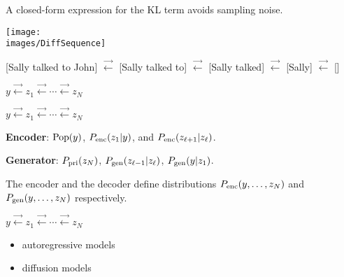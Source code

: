 {{\vfill
A closed-form expression for the KL term avoids sampling noise.
}



\centerline{\texttt{[image: \\images/DiffSequence]}}

\vfill
{\huge
\centerline{{\color{red} [Sally talked to John]} $\stackrel{\rightarrow}{\leftarrow}$ {\color{red} [Sally talked to]}
$\stackrel{\rightarrow}{\leftarrow}$ {\color{red}[Sally talked]} $\stackrel{\rightarrow}{\leftarrow}$ {\color{red}[Sally]} $\stackrel{\rightarrow}{\leftarrow}$ {\color{red} []}}
}

\vfill
\centerline{$y \stackrel{\rightarrow}{\leftarrow} z_1  \stackrel{\rightarrow}{\leftarrow} \cdots \stackrel{\rightarrow}{\leftarrow} z_N$}

\centerline{$y \stackrel{\rightarrow}{\leftarrow} z_1  \stackrel{\rightarrow}{\leftarrow} \cdots \stackrel{\rightarrow}{\leftarrow} z_N$}

\vfill
{\bf Encoder}: $\mathrm{Pop}(y)$, $P_{\mathrm{enc}}(z_1|y)$, and $P_{\mathrm{enc}}(z_{\ell+1}|z_\ell)$.


\vfill
{\bf Generator}: $P_{\mathrm{pri}}(z_N)$, $P_{\mathrm{gen}}(z_{\ell-1}|z_\ell)$, $P_{\mathrm{gen}}(y|z_1)$.

\vfill
The encoder and the decoder define distributions $P_{\mathrm{enc}}(y,\ldots,z_N)$ and $P_{\mathrm{gen}}(y,\ldots,z_N)$ respectively.



\centerline{$y \stackrel{\rightarrow}{\leftarrow} z_1  \stackrel{\rightarrow}{\leftarrow} \cdots \stackrel{\rightarrow}{\leftarrow} z_N$}

\vfill
\begin{itemize}
\item autoregressive models

\vfill
\item diffusion models
\end{itemize}



}
